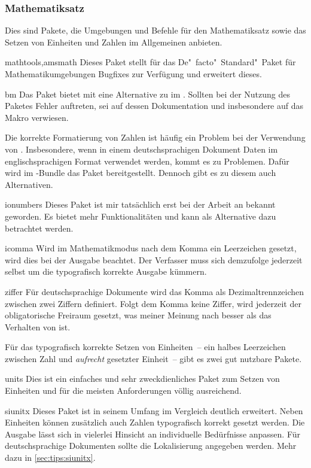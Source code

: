 \subsubsection{Mathematiksatz}
Dies sind Pakete, die Umgebungen und Befehle für den Mathematiksatz sowie das 
Setzen von Einheiten und Zahlen im Allgemeinen anbieten.

\begin{packages}
  \item[mathtools,amsmath]
    Dieses Paket stellt für das De"~facto"~Standard"~Paket  
    für Mathematikumgebungen Bugfixes zur Verfügung und erweitert dieses.
  \item[bm]
    Das Paket bietet mit  eine Alternative zu  im 
    . Sollten bei
    der Nutzung des Paketes Fehler auftreten, sei auf dessen Dokumentation und 
    insbesondere auf das Makro  verwiesen.
\end{packages}
%
Die korrekte Formatierung von Zahlen ist häufig ein Problem bei der Verwendung 
von . Insbesondere, wenn in einem deutschsprachigen Dokument 
Daten im englischsprachigen Format verwendet werden, kommt es zu Problemen. 
Dafür wird im \TUDScript-Bundle das Paket  bereitgestellt. 
Dennoch gibt es zu diesem auch Alternativen.
%
\begin{packages}
%
  \item[ionumbers]
    Dieses Paket ist mir tatsächlich erst bei der Arbeit an  
    bekannt geworden. Es bietet mehr Funktionalitäten und kann als Alternative 
    dazu betrachtet werden.
  \item[icomma]
    Wird im Mathematikmodus nach dem Komma ein Leerzeichen gesetzt, wird dies 
    bei der Ausgabe beachtet. Der Verfasser muss sich demzufolge jederzeit 
    selbst um die typografisch korrekte Ausgabe kümmern.
  \item[ziffer]
    Für deutschsprachige Dokumente wird das Komma als Dezimaltrennzeichen 
    zwischen zwei Ziffern definiert. Folgt dem Komma keine Ziffer, wird 
    jederzeit der obligatorische Freiraum gesetzt, was meiner Meinung nach 
    besser als das Verhalten von  ist.
%
\end{packages}
%
Für das typografisch korrekte Setzen von Einheiten~-- ein halbes Leerzeichen 
zwischen Zahl und \emph{aufrecht} gesetzter Einheit~-- gibt es zwei gut 
nutzbare Pakete.
%
\begin{packages}
%
\item[units]
  Dies ist ein einfaches und sehr zweckdienliches Paket zum Setzen von 
  Einheiten und für die meisten Anforderungen völlig ausreichend.
\item[siunitx]
  Dieses Paket ist in seinem Umfang im Vergleich deutlich erweitert. Neben 
  Einheiten können zusätzlich auch Zahlen typografisch korrekt gesetzt werden. 
  Die Ausgabe lässt sich in vielerlei Hinsicht an individuelle Bedürfnisse 
  anpassen. Für deutschsprachige Dokumenten sollte die Lokalisierung angegeben 
  werden. Mehr dazu in \autoref{sec:tips:siunitx}.
%
\end{packages}
